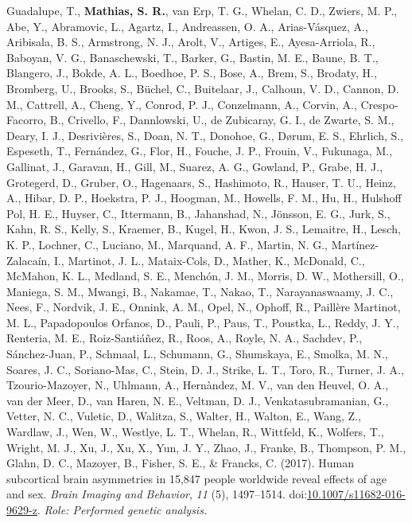 \documentclass[10pt]{article}
\makeatletter
\newlength{\bibhang}
\newlength{\bibsep}
 {\@listi \global\bibsep\itemsep \global\advance\bibsep by\parsep}
\newenvironment{bibsection}%
        {\vspace{-\baselineskip}\begin{list}{}{%
       \setlength{\leftmargin}{\bibhang}%
       \setlength{\itemindent}{-\leftmargin}%
       \setlength{\itemsep}{\bibsep}%
       \setlength{\parsep}{\z@}%
        \setlength{\partopsep}{0pt}%
        \setlength{\topsep}{0pt}}}
        {\end{list}\vspace{-.6\baselineskip}}
\newcommand\doilink[1]{\href{http://dx.doi.org/#1}{#1}}
\newcommand\doi[1]{doi:\doilink{#1}}
\makeatother
\begin{document}
\begin{bibsection}
\item Guadalupe, T., \textbf{Mathias, S. R.}, van Erp, T. G., Whelan, C. D., Zwiers, M. P., Abe, Y., Abramovic, L., Agartz, I., Andreassen, O. A., Arias-V\'{a}squez, A., Aribisala, B. S., Armstrong, N. J., Arolt, V., Artiges, E., Ayesa-Arriola, R., Baboyan, V. G., Banaschewski, T., Barker, G., Bastin, M. E., Baune, B. T., Blangero, J., Bokde, A. L., Boedhoe, P. S., Bose, A., Brem, S., Brodaty, H., Bromberg, U., Brooks, S., B\"uchel, C., Buitelaar, J., Calhoun, V. D., Cannon, D. M., Cattrell, A., Cheng, Y., Conrod, P. J., Conzelmann, A., Corvin, A., Crespo-Facorro, B., Crivello, F., Dannlowski, U., de Zubicaray, G. I., de Zwarte, S. M., Deary, I. J., Desrivi\`{e}res, S., Doan, N. T., Donohoe, G., D\o{}rum, E. S., Ehrlich, S., Espeseth, T., Fern\'{a}ndez, G., Flor, H., Fouche, J. P., Frouin, V., Fukunaga, M., Gallinat, J., Garavan, H., Gill, M., Suarez, A. G., Gowland, P., Grabe, H. J., Grotegerd, D., Gruber, O., Hagenaars, S., Hashimoto, R., Hauser, T. U., Heinz, A., Hibar, D. P., Hoekstra, P. J., Hoogman, M., Howells, F. M., Hu, H., Hulshoff Pol, H. E., Huyser, C., Ittermann, B., Jahanshad, N., J\"{o}nsson, E. G., Jurk, S., Kahn, R. S., Kelly, S., Kraemer, B., Kugel, H., Kwon, J. S., Lemaitre, H., Lesch, K. P., Lochner, C., Luciano, M., Marquand, A. F., Martin, N. G., Mart\'{i}nez-Zalaca\'{i}n, I., Martinot, J. L., Mataix-Cols, D., Mather, K., McDonald, C., McMahon, K. L., Medland, S. E., Mench\'{o}n, J. M., Morris, D. W., Mothersill, O., Maniega, S. M., Mwangi, B., Nakamae, T., Nakao, T., Narayanaswaamy, J. C., Nees, F., Nordvik, J. E., Onnink, A. M., Opel, N., Ophoff, R., Paill\`{e}re Martinot, M. L., Papadopoulos Orfanos, D., Pauli, P., Paus, T., Poustka, L., Reddy, J. Y., Renteria, M. E., Roiz-Santi\'{a}\~{n}ez, R., Roos, A., Royle, N. A., Sachdev, P., S\'{a}nchez-Juan, P., Schmaal, L., Schumann, G., Shumskaya, E., Smolka, M. N., Soares, J. C., Soriano-Mas, C., Stein, D. J., Strike, L. T., Toro, R., Turner, J. A., Tzourio-Mazoyer, N., Uhlmann, A., Hern\`{a}ndez, M. V., van den Heuvel, O. A., van der Meer, D., van Haren, N. E., Veltman, D. J., Venkatasubramanian, G., Vetter, N. C., Vuletic, D., Walitza, S., Walter, H., Walton, E., Wang, Z., Wardlaw, J., Wen, W., Westlye, L. T., Whelan, R., Wittfeld, K., Wolfers, T., Wright, M. J., Xu, J., Xu, X., Yun, J. Y., Zhao, J., Franke, B., Thompson, P. M., Glahn, D. C., Mazoyer, B., Fisher, S. E., \& Francks, C. (2017). Human subcortical brain asymmetries in 15,847 people worldwide reveal effects of age and sex. \emph{Brain Imaging and Behavior}, \emph{11} (5), 1497--1514. \doi{10.1007/s11682-016-9629-z}. \emph{Role: Performed genetic analysis.}


\end{bibsection}
\end{document}
